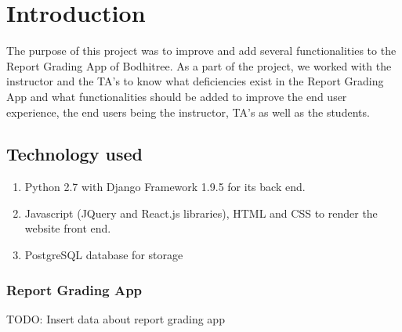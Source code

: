 \section{Introduction}
The purpose of this project was to improve and add several functionalities to the Report Grading App of Bodhitree. As a part of the project, we worked with the instructor and the TA’s to know what deficiencies exist in the Report Grading App and what functionalities should be added to improve the end user experience, the end users being the instructor, TA’s as well as the students.

\subsection{Technology used} %
\begin{enumerate}
\item Python 2.7 with Django Framework 1.9.5 for its back end.
\item Javascript (JQuery and React.js libraries), HTML and CSS to render the website front end.
\item PostgreSQL database for storage
\end{enumerate}

\subsubsection{Report Grading App}
TODO: Insert data about report grading app
